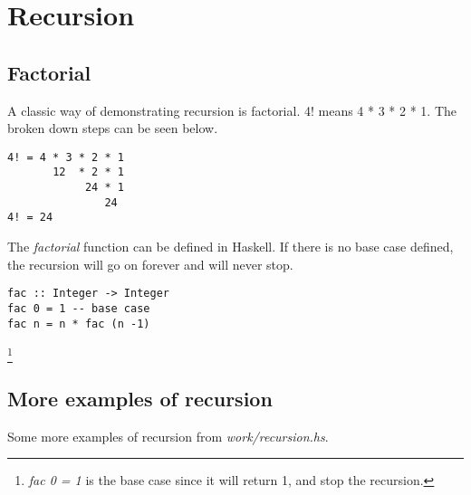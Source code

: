 \section{Recursion}

\subsection{Factorial}
A classic way of demonstrating recursion is factorial. 4! means
4 * 3 * 2 * 1. The broken down steps can be seen below.

\begin{verbatim}
4! = 4 * 3 * 2 * 1
       12  * 2 * 1
            24 * 1
               24
4! = 24
\end{verbatim}

The \emph{factorial} function can be defined in Haskell.
If there is no base case defined, the recursion will go on forever and will never stop.

\begin{lstlisting}
fac :: Integer -> Integer
fac 0 = 1 -- base case
fac n = n * fac (n -1)
\end{lstlisting}

\footnote{\emph{fac 0 = 1} is the base case since it will return 1, and stop the recursion.}

\subsection{More examples of recursion}
Some more examples of recursion from \emph{work/recursion.hs}.



\newpage